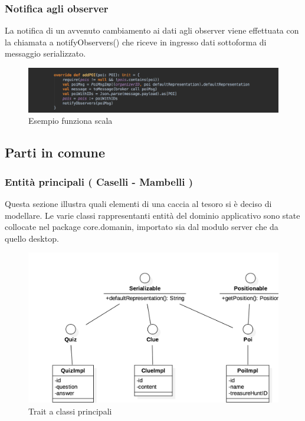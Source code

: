 \documentclass[12pt, italian]{article}
\begin{document}
\subsubsection*{Notifica agli observer}
La notifica di un avvenuto cambiamento ai dati agli observer viene effettuata con la chiamata a notifyObservers() che riceve in ingresso dati sottoforma di messaggio serializzato.

\begin{figure}[H]
	\centering
	\includegraphics[width=1\textwidth]{img/code01.png}
	\caption{Esempio funziona scala}
\end{figure}

\subsection{Parti in comune}

\subsubsection{Entità principali ( Caselli - Mambelli )}
Questa sezione illustra quali elementi di una caccia al tesoro si è deciso di modellare.
Le varie classi rappresentanti entità del dominio applicativo sono state collocate nel package core.domanin, importato sia dal modulo server che da quello desktop.

\begin{figure}[H]
	\centering
	\includegraphics[width=1\textwidth]{img/diagram01.png}
	\caption{Trait a classi principali}
\end{figure}
\end{document}
